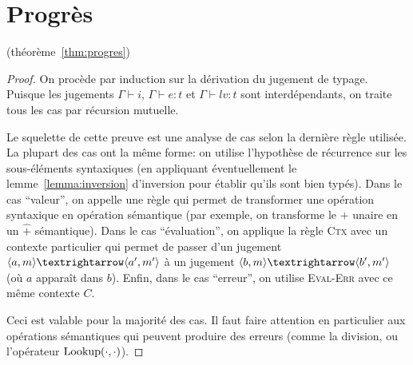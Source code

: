 \section{Progrès}
\label{proof:progres}

(théorème~\ref{thm:progres})

\begin{proof}

On procède par induction sur la dérivation du jugement de typage. Puisque les
jugements $Γ ⊢ i$, $Γ ⊢ e : t$ et $Γ ⊢ lv : t$ sont interdépendants, on traite
tous les cas par récursion mutuelle.

Le squelette de cette preuve est une analyse de cas selon la dernière règle
utilisée. La plupart des cas ont la même forme: on utilise l'hypothèse de
récurrence sur les sous-éléments syntaxiques (en appliquant éventuellement le
lemme~\ref{lemma:inversion} d'inversion pour établir qu'ils sont bien typés).
Dans le cas ``valeur'', on appelle une règle qui permet de transformer une
opération syntaxique en opération sémantique (par exemple, on transforme le $+$
unaire en un $\widehat{+}$ sémantique). Dans le cas ``évaluation'', on applique
la règle \textsc{Ctx} avec un contexte particulier qui permet de passer d'un
jugement $\mm{m}{a}{m'}{a'}$ à un jugement $\mm{m}{b}{m'}{b'}$ (où $a$ apparaît
dans $b$). Enfin, dans le cas ``erreur'', on utilise \textsc{Eval-Err} avec ce
même contexte $C$.

Ceci est valable pour la majorité des cas. Il faut faire attention en
particulier aux opérations sémantiques qui peuvent produire des erreurs (comme
la division, ou l'opérateur $\mathrm{Lookup} (\cdot, \cdot)$).





\end{proof}
